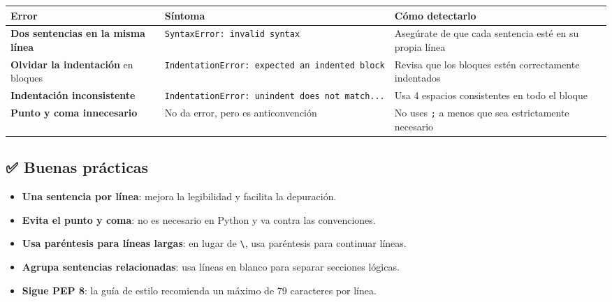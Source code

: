 \documentclass[
  doc,
  floatsintext,
  longtable,
  a4paper,
  nolmodern,
  notxfonts,
  notimes,
  12pt,
  colorlinks=true,linkcolor=blue,citecolor=blue,urlcolor=blue]{apa7}
\providecommand{\tightlist}{%
  \setlength{\itemsep}{0pt}\setlength{\parskip}{0pt}}
\newcounter{none} %
\begin{document}
{\def\LTcaptype{none} %
\begin{longtable}[]{@{}
  >{\raggedright\arraybackslash}p{}
  >{\raggedright\arraybackslash}p{}
  >{\raggedright\arraybackslash}p{}@{}}
\toprule\noalign{}
\begin{minipage}[b]{\linewidth}\raggedright
Error
\end{minipage} & \begin{minipage}[b]{\linewidth}\raggedright
Síntoma
\end{minipage} & \begin{minipage}[b]{\linewidth}\raggedright
Cómo detectarlo
\end{minipage} \\
\midrule\noalign{}
\endhead
\bottomrule\noalign{}
\endlastfoot
\textbf{Dos sentencias en la misma línea} &
\texttt{SyntaxError:\ invalid\ syntax} & Asegúrate de que cada sentencia
esté en su propia línea \\
\textbf{Olvidar la indentación} en bloques &
\texttt{IndentationError:\ expected\ an\ indented\ block} & Revisa que
los bloques estén correctamente indentados \\
\textbf{Indentación inconsistente} &
\texttt{IndentationError:\ unindent\ does\ not\ match...} & Usa 4
espacios consistentes en todo el bloque \\
\textbf{Punto y coma innecesario} & No da error, pero es anticonvención
& No uses \texttt{;} a menos que sea estrictamente necesario \\
\end{longtable}
}

\subsection{✅ Buenas prácticas}\label{buenas-pruxe1cticas}

\begin{itemize}
\tightlist
\item
  \textbf{Una sentencia por línea}: mejora la legibilidad y facilita la
  depuración.
\item
  \textbf{Evita el punto y coma}: no es necesario en Python y va contra
  las convenciones.
\item
  \textbf{Usa paréntesis para líneas largas}: en lugar de
  \texttt{\textbackslash{}}, usa paréntesis para continuar líneas.
\item
  \textbf{Agrupa sentencias relacionadas}: usa líneas en blanco para
  separar secciones lógicas.
\item
  \textbf{Sigue PEP 8}: la guía de estilo recomienda un máximo de 79
  caracteres por línea.
\end{itemize}
\end{document}
